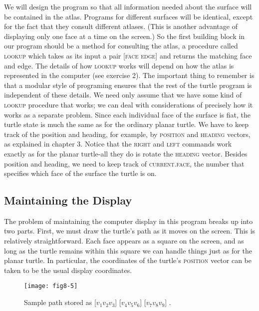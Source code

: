 \documentclass{book}
\begin{document}
We will design the program so that all information needed about the
surface will be contained in the atlas. Programs for different surfaces
will be identical, except for the fact that they consult different atlases.
(This is another advantage of displaying only one face at a time on the
screen.) So the first building block in our program should be a method
for consulting the atlas, a procedure called \textsc{lookup} which takes as its
input a pair [\textsc{face}\textsc{ edge}] and returns the matching face and edge. The
details of how \textsc{lookup} works will depend on how the atlas is represented
in the computer (see exercise 2). The important thing to remember is
that a modular style of programing ensures that the rest of the turtle
program is independent of these details. We need only assume that
we have some kind of \textsc{lookup} procedure that works; we can deal with
considerations of precisely how it works as a separate problem.
Since each individual face of the surface is fiat, the turtle state is much
the same as for the ordinary planar turtle. We have to keep track of the
position and heading, for example, by \textsc{position} and \textsc{heading} vectors, as
explained in chapter 3. Notice that the \textsc{right} and \textsc{left} commands work
exactly as for the planar turtle-all they do is rotate the \textsc{heading} vector.
Besides position and heading, we need to keep track of \textsc{current}\textsc{.face},
the number that specifies which face of the surface the turtle is on.

\subsection{Maintaining the Display}

The problem of maintaining the computer display in this program breaks
up into two parts. First, we must draw the turtle's path as it moves
on the screen. This is relatively straightforward. Each face appears as
a square on the screen, and as long as the turtle remains within this
square we can handle things just as for the planar turtle. In particular,
the coordinates of the turtle's \textsc{position} vector can be taken to be the
usual display coordinates.

\begin{figure}
\begin{center}
\texttt{[image: fig8-5]}
\caption{Sample path stored as [$v_1 v_2 v_3$] [$v_4 v_5 v_6$] [$v_7 v_8 v_9$] .}
\end{center}
\end{figure}
\end{document}
